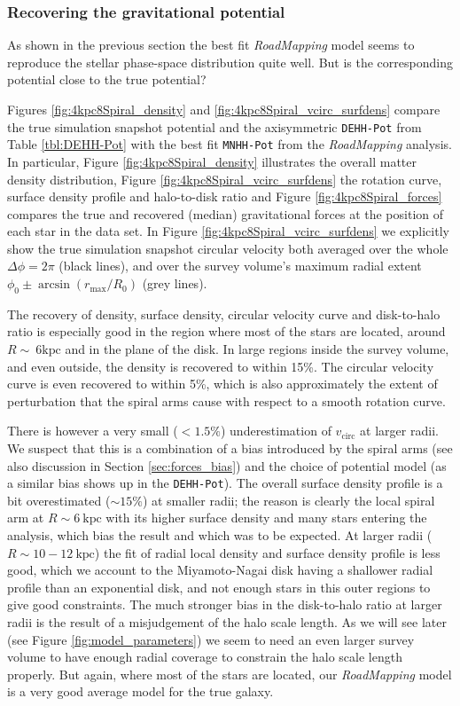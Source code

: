 \documentclass[iop,revtex4,numberedappendix,appendixfloats]{emulateapj}
\newcommand{\RM}{{\sl RoadMapping}}
\begin{document}
\subsubsection{Recovering the gravitational potential} \label{sec:4kpc8Spiral_potential}

As shown in the previous section the best fit \RM{} model seems to reproduce the stellar phase-space distribution quite well. But is the corresponding potential close to the true potential? 

Figures \ref{fig:4kpc8Spiral_density} and \ref{fig:4kpc8Spiral_vcirc_surfdens} compare the true simulation snapshot potential and the axisymmetric \texttt{DEHH-Pot} from Table \ref{tbl:DEHH-Pot} with the best fit \texttt{MNHH-Pot} from the \RM{} analysis. In particular, Figure \ref{fig:4kpc8Spiral_density} illustrates the overall matter density distribution, Figure \ref{fig:4kpc8Spiral_vcirc_surfdens} the rotation curve, surface density profile and halo-to-disk ratio and Figure \ref{fig:4kpc8Spiral_forces} compares the true and recovered (median) gravitational forces at the position of each star in the data set. In Figure \ref{fig:4kpc8Spiral_vcirc_surfdens} we explicitly show the true simulation snapshot circular velocity both averaged over the whole $\Delta\phi=2\pi$ (black lines), and over the survey volume's maximum radial extent $\phi_0\pm \arcsin(r_\text{max}/R_0)$ (grey lines).

The recovery of density, surface density, circular velocity curve and disk-to-halo ratio is especially good in the region where most of the stars are located, around $R\sim~6\text{kpc}$ and in the plane of the disk. In large regions inside the survey volume, and even outside, the density is recovered to within 15\%. The circular velocity curve is even recovered to within 5\%, which is also approximately the extent of perturbation that the spiral arms cause with respect to a smooth rotation curve.

There is however a very small ($<1.5\%$) underestimation of $v_\text{circ}$ at larger radii. We suspect that this is a combination of a bias introduced by the spiral arms (see also discussion in Section \ref{sec:forces_bias}) and the choice of potential model (as a similar bias shows up in the \texttt{DEHH-Pot}). The overall surface density profile is a bit overestimated ($\sim 15\%$) at smaller radii; the reason is clearly the local spiral arm at $R\sim6~\text{kpc}$ with its higher surface density  and many stars entering the analysis, which bias the result and which was to be expected. At larger radii ($R\sim10-12~\text{kpc}$) the fit of radial local density and surface density profile is less good, which we account to the Miyamoto-Nagai disk having a shallower radial profile than an exponential disk, and not enough stars in this outer regions to give good constraints. The much stronger bias in the disk-to-halo ratio at larger radii is the result of a misjudgement of the halo scale length. As we will see later (see Figure \ref{fig:model_parameters}) we seem to need an even larger survey volume to have enough radial coverage to constrain the halo scale length properly. But again, where most of the stars are located, our \RM{} model is a very good average model for the true galaxy.
\end{document}
